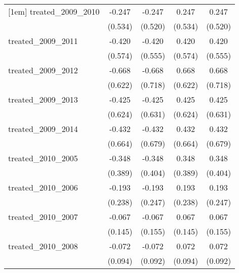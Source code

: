 {\begin{tabular}{l*{4}{c}}
[1em]
treated\_2009\_2010&      -0.247         &      -0.247         &       0.247         &       0.247         \\
            &     (0.534)         &     (0.520)         &     (0.534)         &     (0.520)         \\
[1em]
treated\_2009\_2011&      -0.420         &      -0.420         &       0.420         &       0.420         \\
            &     (0.574)         &     (0.555)         &     (0.574)         &     (0.555)         \\
[1em]
treated\_2009\_2012&      -0.668         &      -0.668         &       0.668         &       0.668         \\
            &     (0.622)         &     (0.718)         &     (0.622)         &     (0.718)         \\
[1em]
treated\_2009\_2013&      -0.425         &      -0.425         &       0.425         &       0.425         \\
            &     (0.624)         &     (0.631)         &     (0.624)         &     (0.631)         \\
[1em]
treated\_2009\_2014&      -0.432         &      -0.432         &       0.432         &       0.432         \\
            &     (0.664)         &     (0.679)         &     (0.664)         &     (0.679)         \\
[1em]
treated\_2010\_2005&      -0.348         &      -0.348         &       0.348         &       0.348         \\
            &     (0.389)         &     (0.404)         &     (0.389)         &     (0.404)         \\
[1em]
treated\_2010\_2006&      -0.193         &      -0.193         &       0.193         &       0.193         \\
            &     (0.238)         &     (0.247)         &     (0.238)         &     (0.247)         \\
[1em]
treated\_2010\_2007&      -0.067         &      -0.067         &       0.067         &       0.067         \\
            &     (0.145)         &     (0.155)         &     (0.145)         &     (0.155)         \\
[1em]
treated\_2010\_2008&      -0.072         &      -0.072         &       0.072         &       0.072         \\
            &     (0.094)         &     (0.092)         &     (0.094)         &     (0.092)         \\

\end{tabular}}
